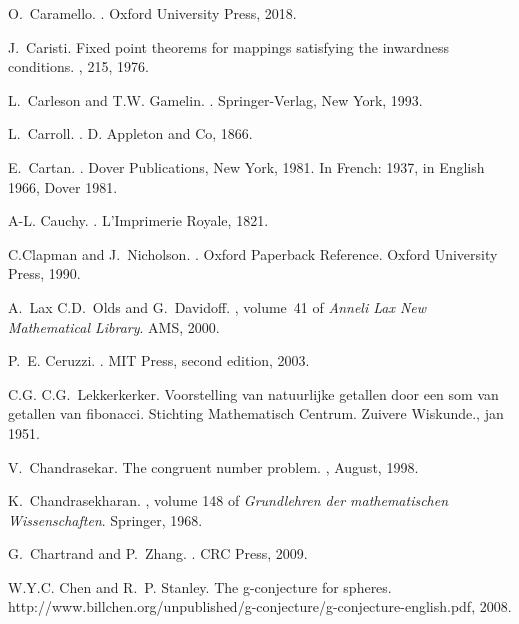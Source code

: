 \documentclass[12pt]{amsart}
\begin{document}
\begin{thebibliography}{100}
O.~Caramello.
.
\newblock Oxford University Press, 2018.

J.~Caristi.
\newblock Fixed point theorems for mappings satisfying the inwardness
  conditions.
, 215, 1976.

L.~Carleson and T.W. Gamelin.
.
\newblock Springer-Verlag, New York, 1993.

L.~Carroll.
.
\newblock D. Appleton and Co, 1866.

E.~Cartan.
.
\newblock Dover Publications, New York, 1981.
\newblock In French: 1937, in English 1966, Dover 1981.

A-L. Cauchy.
.
\newblock L'Imprimerie Royale, 1821.

C.Clapman and J.~Nicholson.
.
\newblock Oxford Paperback Reference. Oxford University Press, 1990.

A.~Lax C.D.~Olds and G.~Davidoff.
, volume~41 of {\em Anneli Lax New
  Mathematical Library}.
\newblock AMS, 2000.

P.~E. Ceruzzi.
.
\newblock MIT Press, second edition, 2003.

C.G. C.G.~Lekkerkerker.
\newblock Voorstelling van natuurlijke getallen door een som van getallen van
  fibonacci.
\newblock Stichting Mathematisch Centrum. Zuivere Wiskunde., jan 1951.

V.~Chandrasekar.
\newblock The congruent number problem.
, August, 1998.

K.~Chandrasekharan.
, volume 148 of {\em
  Grundlehren der mathematischen Wissenschaften}.
\newblock Springer, 1968.

G.~Chartrand and P.~Zhang.
.
\newblock CRC Press, 2009.

W.Y.C. Chen and R.~P. Stanley.
\newblock The g-conjecture for spheres.
\newblock
  http://www.billchen.org/unpublished/g-conjecture/g-conjecture-english.pdf,
  2008.


\end{thebibliography}
\end{document}
